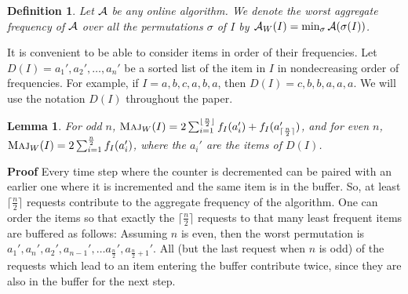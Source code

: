 \documentclass[11pt]{article}
\newtheorem{xdefinition}{Definition}
\newtheorem{xlemma}{Lemma}
\newenvironment{definition}{\begin{xdefinition}\rm}{\hspace*{\fill}\raisebox{-1pt}{\boldmath$\Box$}\end{xdefinition}}
\newenvironment{lemma}{\begin{xlemma}\rm}{\end{xlemma}}
\newenvironment{proof}{\begin{trivlist}\item[]{\bf Proof }}{\hspace*{\fill}\raisebox{-1pt}{\boldmath$\Box$}\end{trivlist}}
\newcommand{\maj}{{\ensuremath{\textsc{Maj}}}\xspace}
\begin{document}
\begin{definition}\label{def:worstpermut}
Let ${\cal A}$ be any online algorithm.
We denote the worst aggregate frequency of ${\cal A}$ 
over all the
permutations $\sigma$ of $I$ by
${\cal A}_{W}(I) = \min_{\sigma} {\cal A} (\sigma(I))$.
\end{definition}
It is convenient to be able to consider items in order of their
frequencies.
Let $D(I) = a_1', a_2',\ldots, a_n'$ be a sorted list of the item
in $I$ in nondecreasing order of frequencies.
For example, if $I = a, b, c, a, b, a$, then $D(I) = c,b,b,a,a,a$.
We will use the notation $D(I)$ throughout the paper.
\begin{lemma}\label{lem:wmaj}
For odd $n$,
 $\maj_{W}(I) = 2\sum_{i=1}^{\lfloor \frac{n}{2} \rfloor} f_I(a_i')
+ f_I(a_{\lceil \frac{n}{2}\rceil}')$,
and for even $n$,
$\maj_{W}(I) = 2\sum_{i=1}^{\frac{n}{2}} f_I(a_i')$,
where the $a_i'$ are the items of $D(I)$.
\end{lemma}
\begin{proof}
Every time step where the counter is decremented can be paired with an
earlier one
where it is incremented and the same item is in the buffer.
So, at least $\lceil\frac{n}{2}\rceil$ requests contribute to the aggregate frequency of the algorithm.
One can order the items so that exactly the $\lceil \frac{n}{2}\rceil$
requests to that many least frequent items are buffered as follows:
Assuming $n$ is even, then the worst permutation is $a_1', a_n',  a_2',a_{n-1}',\ldots  a_{\frac{n}{2}}', a_{\frac{n}{2}+1}'$.
All  (but the last request when $n$ is odd) of the requests which lead
to an item entering the buffer contribute twice, since they are also in
the buffer for the next step.
\end{proof}
\end{document}
